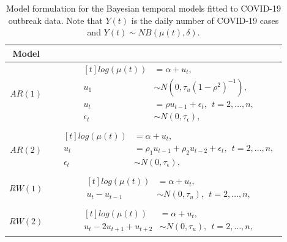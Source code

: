 \documentclass[10pt,letterpaper]{article}
\begin{document}
\begin{table}[!h]
	
	\caption{\label{tab:Models}Model formulation for the Bayesian temporal models fitted to COVID-19 outbreak data. Note that $Y(t)$ is the daily number of COVID-19 cases and \(Y(t) \sim NB(\mu(t), \delta)\).}
	\centering
	\begin{tabular}[t]{ccc}
		\hline
		Model& & \\
		\hline
		\(AR(1)\)& & $\begin{aligned}[t]
		log(\mu(t)) &= \alpha+u_t,\\
		u_1 &\sim N(0, \tau_u(1-\rho^2)^{-1}),\\
		u_t &=\rho u_{t-1} +\epsilon_t, \ \ t=2, \dots, n,\\
		\epsilon_t & \sim N(0, \tau_{\epsilon}),
		\end{aligned}$\\
		& & \\
		\(AR(2)\)& &$\begin{aligned}[t]
		log(\mu(t)) &= \alpha+u_t,\\
		u_t &=\rho_1 u_{t-1}+\rho_2 u_{t-2} +\epsilon_t, \ \ t=2, \dots, n,\\
		\epsilon_t & \sim N(0, \tau_{\epsilon}),
		\end{aligned}$\\
		& & \\
		\(RW(1)\)& &  $\begin{aligned}[t]
		log(\mu(t)) &= \alpha+u_t, \\
		u_t-u_{t-1} &\sim N(0, \tau_u), \ \ t=2, \dots, n,
		\end{aligned}$\\
		& & \\
		\(RW(2)\)& &  $\begin{aligned}[t]
		log(\mu(t)) &= \alpha+u_t, \\
		u_t-2u_{t+1}+u_{t+2} &\sim N(0, \tau_u), \ \ t=2, \dots, n,
		\end{aligned}$\\
		\hline
	\end{tabular}
\end{table}
\end{document}
